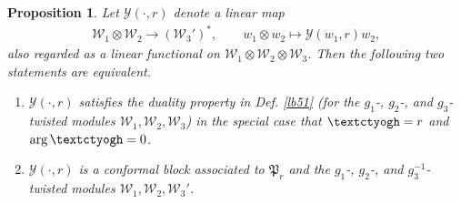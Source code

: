 \documentclass[11pt,b5paper,notitlepage]{article}
\theoremstyle{definition}
\theoremstyle{plain}
\newtheorem{pp}[df]{Proposition}
\newcommand{\fk}{\mathfrak}
\newcommand{\mc}{\mathcal}
\newcommand{\tipaz}{\text{\textctyogh}}
\numberwithin{equation}{subsection}
\begin{document}
\begin{pp}\label{lb54}
Let $\mc Y(\cdot,r)$ denote a linear map
\begin{gather*}
\mc W_1\otimes \mc W_2\rightarrow (\mc W_3')^*,\qquad w_1\otimes w_2\mapsto\mc Y(w_1,r)w_2,	
\end{gather*}
also regarded as a linear functional on $\mc W_1\otimes\mc W_2\otimes \mc W_3$. Then the following two statements are equivalent.
\begin{enumerate}
\item $\mc Y(\cdot,r)$ satisfies the duality property in Def. \ref{lb51} (for the $g_1$-, $g_2$-, and $g_3$-twisted modules $\mc W_1,\mc W_2,\mc W_3$) in the special case that $\tipaz=r$ and $\arg\tipaz=0$.	
\item $\mc Y(\cdot,r)$ is a conformal block associated to $\fk P_r$ and the $g_1$-, $g_2$-, and $g_3^{-1}$-twisted modules $\mc W_1,\mc W_2,\mc W_3'$.
\end{enumerate}	
\end{pp}
\end{document}
